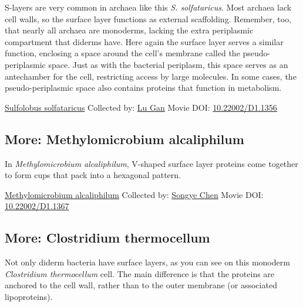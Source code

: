 \documentclass[]{tufte-book}
\begin{document}
S-layers are very common in archaea like this \emph{S. solfataricus}. Most archaea lack cell walls, so the surface layer functions as external scaffolding. Remember, too, that nearly all archaea are monoderms, lacking the extra periplasmic compartment that diderms have. Here again the surface layer serves a similar function, enclosing a space around the cell's membrane called the pseudo-periplasmic space. Just as with the bacterial periplasm, this space serves as an antechamber for the cell, restricting access by large molecules. In some cases, the pseudo-periplasmic space also contains proteins that function in metabolism.



\hypertarget{htmlwidget-7b1cc699cc4708b6d835}{}

\label{fig:2-7}\protect\hyperlink{tree}{Sulfolobus solfataricus} Collected by: \protect\hyperlink{lu_gan}{Lu Gan} Movie DOI: \href{https://doi.org/10.22002/D1.1356}{10.22002/D1.1356}

\hypertarget{Methylomicrobium_alcaliphilum}{%
\subsection*{More: Methylomicrobium alcaliphilum}\label{Methylomicrobium_alcaliphilum}}

In \emph{Methylomicrobium alcaliphilum}, V-shaped surface layer proteins come together to form cups that pack into a hexagonal pattern.



\hypertarget{htmlwidget-00f7db42c981a246fb5f}{}

\label{fig:2-7a}\protect\hyperlink{tree}{Methylomicrobium alcaliphilum} Collected by: \protect\hyperlink{songye_chen}{Songye Chen} Movie DOI: \href{https://doi.org/10.22002/D1.1367}{10.22002/D1.1367}

\hypertarget{Clostridium_thermocellum}{%
\subsection*{More: Clostridium thermocellum}\label{Clostridium_thermocellum}}

Not only diderm bacteria have surface layers, as you can see on this monoderm \emph{Clostridium thermocellum} cell. The main difference is that the proteins are anchored to the cell wall, rather than to the outer membrane (or associated lipoproteins).
\end{document}
